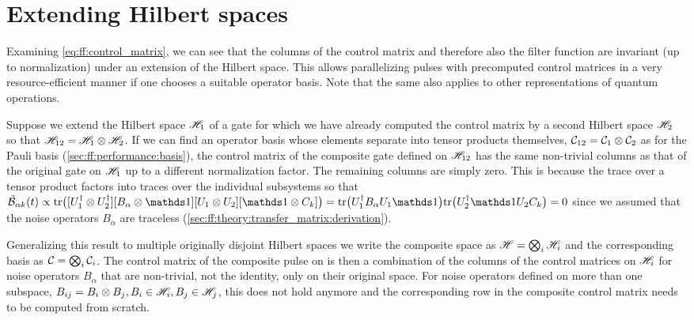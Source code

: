 \section{Extending Hilbert spaces}\label{sec:ff:performance:extending_hilbert_spaces}
Examining \cref{eq:ff:control_matrix}, we can see that the columns of the control matrix and therefore also the filter function are invariant (up to normalization) under an extension of the Hilbert space.
This allows parallelizing pulses with precomputed control matrices in a very resource-efficient manner if one chooses a suitable operator basis.
Note that the same also applies to other representations of quantum operations.

Suppose we extend the Hilbert space $\mathscr{H}_1$ of a gate for which we have already computed the control matrix by a second Hilbert space $\mathscr{H}_2$ so that $\mathscr{H}_{12} = \mathscr{H}_1\otimes\mathscr{H}_2$.
If we can find an operator basis whose elements separate into tensor products themselves, \ie $\mathcal{C}_{12} = \mathcal{C}_1\otimes\mathcal{C}_2$ as for the Pauli basis (\cf \cref{sec:ff:performance:basis}), the control matrix of the composite gate defined on $\mathscr{H}_{12}$ has the same non-trivial columns as that of the original gate on $\mathscr{H}_1$ up to a different normalization factor.
The remaining columns are simply zero.
This is because the trace over a tensor product factors into traces over the individual subsystems so that $\ctrlmat_{\alpha k}(t)\propto\mr{tr}\bigl([U_1\adjoint\otimes U_2\adjoint][B_\alpha\otimes\eye][U_1\otimes U_2][\eye\otimes C_k]\bigr) = \mr{tr}\bigl(U_1\adjoint B_\alpha U_1\eye\bigr)\mr{tr}\bigl(U_2\adjoint\eye U_2 C_k\bigr) = 0$ since we assumed that the noise operators $B_\alpha$ are traceless (\cf \cref{sec:ff:theory:transfer_matrix:derivation}).

Generalizing this result to multiple originally disjoint Hilbert spaces we write the composite space as $\mathscr{H} = \bigotimes_i\mathscr{H}_i$ and the corresponding basis as $\mathcal{C} = \bigotimes_i\mathcal{C}_i$.
The control matrix of the composite pulse on \Hspace is then a combination of the columns of the control matrices on $\mathscr{H}_i$ for noise operators $B_\alpha$ that are non-trivial, \ie not the identity, only on their original space.
For noise operators defined on more than one subspace, \eg $B_{ij} = B_i\otimes B_j, B_i\in\mathscr{H}_i, B_j\in\mathscr{H}_j$, this does not hold anymore and the corresponding row in the composite control matrix needs to be computed from scratch.

